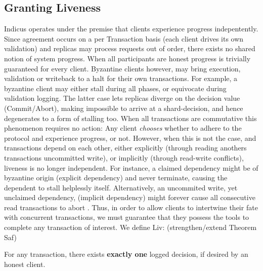 \subsection{Granting Liveness}
Indicus operates under the premise that clients experience progress indepentently. Since agreement occurs on a per Transaction basis (each client drives its own validation) and replicas may process requests out of order, there exists no shared notion of system progress. When all participants are honest progress is trivially guaranteed for every client. Byzantine clients however, may bring execution, validation or writeback to a halt for their own transactions. For example, a byzantine client may either stall during all phases, or equivocate during validation logging. The latter case lets replicas diverge on the decision value (Commit/Abort), making impossible to arrive at a shard-decision, and hence degenerates to a form of stalling too. When all transactions are commutative this phenomenon requires no action: Any client \textit{chooses} whether to adhere to the protocol and experience progress, or not. However, when this is not the case, and transactions depend on each other, either explicitly (through reading anothers transactions uncommitted write), or implicitly (through read-write conflicts), liveness is no longer independent. For instance, a claimed dependency might be of byzantine origin (explicit dependency) and never terminate, causing the dependent to stall helplessly itself. Alternatively, an uncommited write, yet unclaimed dependency, (implicit dependency) might forever cause all consecutive read transactions to abort  .
Thus, in order to allow clients to intertwine their fate with concurrent transactions, we must guarantee that they possess the tools to complete any transaction of interest. We define Liv: (strengthen/extend Theorem Saf)

\begin{theorem}[Liv] 
For any transaction, there exists \textbf{exactly one} logged decision, if desired by an honest client.
\end{theorem}

